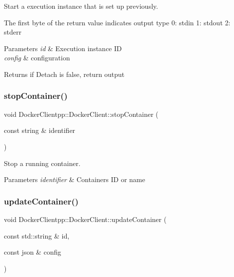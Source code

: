 Start a execution instance that is set up previously. 

The first byte of the return value indicates output type 0\+: stdin 1\+: stdout 2\+: stderr


\begin{DoxyParams}{Parameters}
{\em id} & Execution instance ID \\
\hline
{\em config} & configuration \\
\hline
\end{DoxyParams}
\begin{DoxyReturn}{Returns}
if Detach is false, return output 
\end{DoxyReturn}
\mbox{\label{classDockerClientpp_1_1DockerClient_a95a1b97085675199a5857515cde811b0}} 
\subsubsection{\texorpdfstring{stopContainer()}{stopContainer()}}
{\footnotesize\ttfamily void Docker\+Clientpp\+::\+Docker\+Client\+::stop\+Container (\begin{DoxyParamCaption}\item[{const string \&}]{identifier }\end{DoxyParamCaption})}



Stop a running container. 


\begin{DoxyParams}{Parameters}
{\em identifier} & Container\textquotesingle{}s ID or name \\
\hline
\end{DoxyParams}
\mbox{\label{classDockerClientpp_1_1DockerClient_a402bac91e8a77c25f6c2159860844b71}} 
\subsubsection{\texorpdfstring{updateContainer()}{updateContainer()}}
{\footnotesize\ttfamily void Docker\+Clientpp\+::\+Docker\+Client\+::update\+Container (\begin{DoxyParamCaption}\item[{const std\+::string \&}]{id,  }\item[{const json \&}]{config }\end{DoxyParamCaption})}



